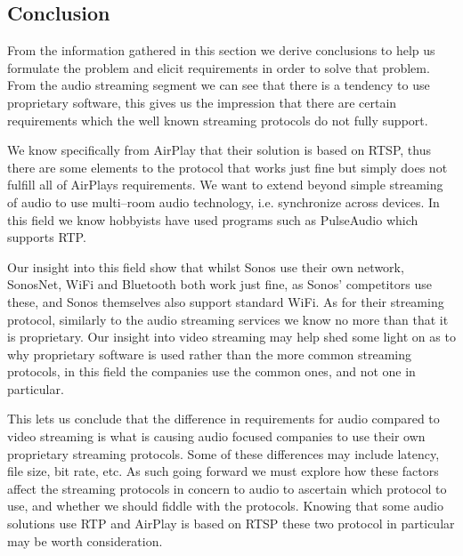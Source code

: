 \subsection{Conclusion}
From the information gathered in this section we derive conclusions to help us formulate the problem and elicit requirements in order to solve that problem.
From the audio streaming segment we can see that there is a tendency to use proprietary software, this gives us the impression that there are certain requirements which the well known streaming protocols do not fully support. 

We know specifically from AirPlay that their solution is based on \ac{RTSP}, thus there are some elements to the protocol that works just fine but simply does not fulfill all of AirPlays requirements.
We want to extend beyond simple streaming of audio to use multi--room audio technology, i.e. synchronize across devices.
In this field we know hobbyists have used programs such as PulseAudio which supports \ac{RTP}.

Our insight into this field show that whilst Sonos use their own network, SonosNet, WiFi and Bluetooth both work just fine, as Sonos' competitors use these, and Sonos themselves also support standard WiFi.
As for their streaming protocol, similarly to the audio streaming services we know no more than that it is proprietary.
Our insight into video streaming may help shed some light on as to why proprietary software is used rather than the more common streaming protocols, in this field the companies use the common ones, and not one in particular.

This lets us conclude that the difference in requirements for audio compared to video streaming is what is causing audio focused companies to use their own proprietary streaming protocols.
Some of these differences may include latency, file size, bit rate, etc.
As such going forward we must explore how these factors affect the streaming protocols in concern to audio to ascertain which protocol to use, and whether we should fiddle with the protocols.
Knowing that some audio solutions use \ac{RTP} and AirPlay is based on \ac{RTSP} these two protocol in particular may be worth consideration.





